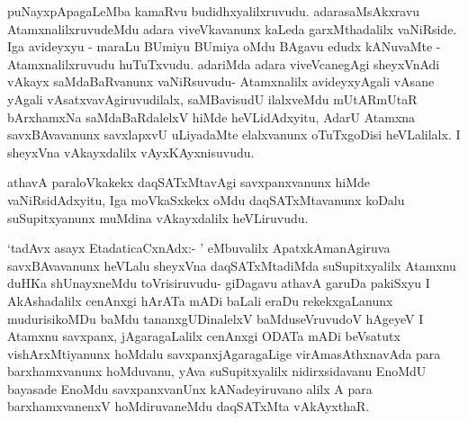 \begin{artha}
puNayxpApagaLeMba kamaRvu budidhxyalilxruvudu. adara\break saMsAkxravu AtamxnalilxruvudeMdu adara viveVkavanunx kaLeda garxMthadalilx vaNiRside. Iga avideyxyu - maraLu BUmiyu BUmiya oMdu BAgavu edudx kANuvaMte - Atamxnalilxruvudu huTuTxvudu. adariMda adara viveVcanegAgi sheyxVnAdi vAkayx saMdaBaRvanunx vaNiRsuvudu- Atamxnalilx avideyxyAgali vAsane yAgali vAsatxvavAgiruvudilalx, saMBavisudU ilalxveMdu mUtARmUtaR bArxhamxNa saMdaBaRdalelxV hiMde heVLidAdxyitu, AdarU Atamxna savxBAvavanunx savxlapxvU uLiyadaMte elalxvanunx oTuTxgoDisi heVLalilalx. I sheyxVna vAkayxdalilx vAyxKAyxnisuvudu. 
\end{artha}

\begin{artha}
athavA paraloVkakekx daqSATxMtavAgi savxpanxvanunx hiMde vaNiRsi\-\break dAdxyitu,
Iga moVkaSxkekx oMdu daqSATxMtavanunx koDalu suSupitxyanunx muMdina vAkayxdalilx heVLiruvudu.
\end{artha}


\begin{artha}
`tadAvx asayx EtadaticaCxnAdx:- ' eMbuvalilx ApatxkAmanAgiruva savxBAvavanunx heVLalu sheyxVna daqSATxMtadiMda suSupitxyalilx Atamxnu duHKa shUnayxneMdu toVrisiruvudu- giDagavu athavA garuDa pakiSxyu I AkAshadalilx cenAnxgi hArATa mADi baLali eraDu rekekxgaLanunx mudurisikoMDu baMdu tananxgUDinalelxV baMdu\break seVruvudoV hAgeyeV I Atamxnu savxpanx, jAgaragaLalilx cenAnxgi ODATa mADi beVsatutx vishArxMtiyanunx hoMdalu savxpanxjAgaragaLige virAmasAthxnavAda para barxhamxvanunx hoMduvanu, yAva suSupitxyalilx nidirxsidavanu EnoMdU bayasade EnoMdu savxpanxvanUnx kANadeyiruvano alilx A para barxhamxvanenxV hoMdiruvaneMdu daqSATxMta vAkAyxthaR. 
\end{artha}%

